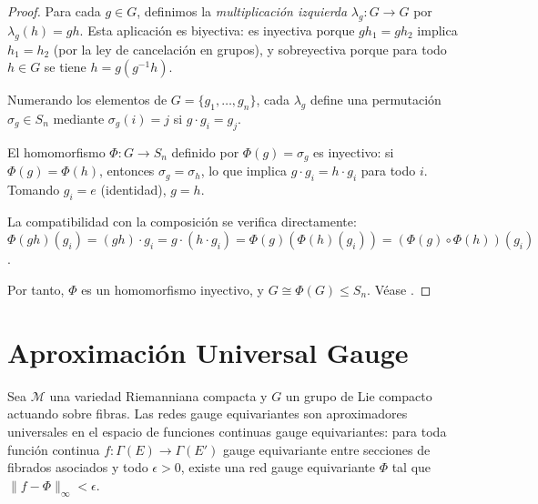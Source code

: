 \begin{proof}
Para cada $g \in G$, definimos la \textit{multiplicación izquierda} $\lambda_g: G \to G$ por $\lambda_g(h) = gh$. Esta aplicación es biyectiva: es inyectiva porque $gh_1 = gh_2$ implica $h_1 = h_2$ (por la ley de cancelación en grupos), y sobreyectiva porque para todo $h \in G$ se tiene $h = g(g^{-1}h)$.

Numerando los elementos de $G = \{g_1, \ldots, g_n\}$, cada $\lambda_g$ define una permutación $\sigma_g \in S_n$ mediante $\sigma_g(i) = j$ si $g \cdot g_i = g_j$.

El homomorfismo $\Phi: G \to S_n$ definido por $\Phi(g) = \sigma_g$ es inyectivo: si $\Phi(g) = \Phi(h)$, entonces $\sigma_g = \sigma_h$, lo que implica $g \cdot g_i = h \cdot g_i$ para todo $i$. Tomando $g_i = e$ (identidad), $g = h$.

La compatibilidad con la composición se verifica directamente: $\Phi(gh)(g_i) = (gh) \cdot g_i = g \cdot (h \cdot g_i) = \Phi(g)(\Phi(h)(g_i)) = (\Phi(g) \circ \Phi(h))(g_i)$.

Por tanto, $\Phi$ es un homomorfismo inyectivo, y $G \cong \Phi(G) \leq S_n$. Véase \citep[Sección~4.2]{dummit2004abstract}.
\end{proof}

\section{Aproximación Universal Gauge}\label{sec:aproximacion_universal_gauge}

\begin{theorem}\label{thm:aproximacion_universal_gauge_apendice}
Sea $\mathcal{M}$ una variedad Riemanniana compacta y $G$ un grupo de Lie compacto actuando sobre fibras. Las redes gauge equivariantes son aproximadores universales en el espacio de funciones continuas gauge equivariantes: para toda función continua $f: \Gamma(E) \to \Gamma(E')$ gauge equivariante entre secciones de fibrados asociados y todo $\epsilon > 0$, existe una red gauge equivariante $\Phi$ tal que $\|f - \Phi\|_\infty < \epsilon$.
\end{theorem}

